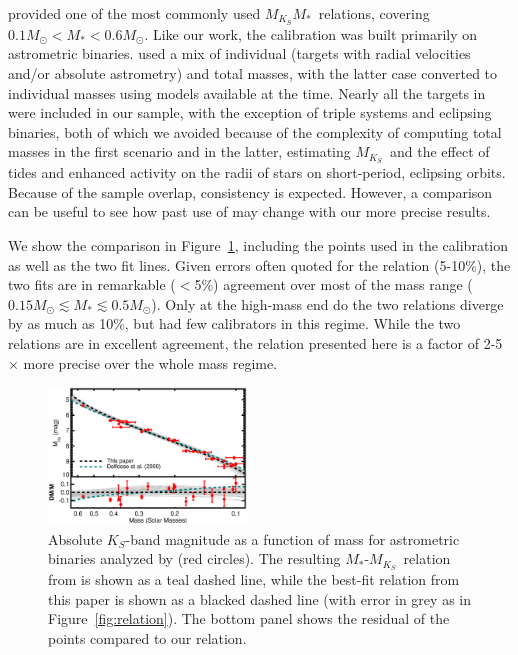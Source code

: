 \documentclass[twocolumn]{aastex62}
\newcommand{\mks}{$M_{K_S}$}
\newcommand{\mmk}{$M_{K_S}$\textendash$M_*$}
\begin{document}
\citet{Delfosse2000} provided one of the most commonly used \mmk\ relations, covering $0.1M_\odot<M_*<0.6M_\odot$. Like our work, the calibration was built primarily on astrometric binaries. \citet{Delfosse2000} used a mix of individual (targets with radial velocities and/or absolute astrometry) and total masses, with the latter case converted to individual masses using models available at the time. Nearly all the targets in \citet{Delfosse2000} were included in our sample, with the exception of triple systems and eclipsing binaries, both of which we avoided because of the complexity of computing total masses in the first scenario and in the latter, estimating \mks\ and the effect of tides and enhanced activity on the radii of stars on short-period, eclipsing orbits. Because of the sample overlap, consistency is expected. However, a comparison can be useful to see how past use of \citet{Delfosse2000} may change with our more precise results.

We show the comparison in Figure~\ref{fig:delfosse}, including the points used in the \citet{Delfosse2000} calibration as well as the two fit lines. Given errors often quoted for the \citet{Delfosse2000} relation (5-10\%), the two fits are in remarkable ($<$5\%) agreement over most of the mass range ($0.15M_\odot \lesssim M_* \lesssim 0.5M_\odot$). Only at the high-mass end do the two relations diverge by as much as 10\%, but \citet{Delfosse2000} had few calibrators in this regime. While the two relations are in excellent agreement, the relation presented here is a factor of 2-5$\times$ more precise over the whole mass regime. 

\begin{figure}[htb]
\begin{center}
\includegraphics[width=0.47\textwidth]{Delfosse_comp.eps}
\caption{Absolute $K_S$-band magnitude as a function of mass for astrometric binaries analyzed by \citet{Delfosse2000} (red circles). The resulting $M_*$-\mks\ relation from \citet{Delfosse2000} is shown as a teal dashed line, while the best-fit relation from this paper is shown as a blacked dashed line (with error in grey as in Figure~\ref{fig:relation}). The bottom panel shows the residual of the \citet{Delfosse2000} points compared to our relation.}
\label{fig:delfosse}
\end{center}
\end{figure}
\end{document}
